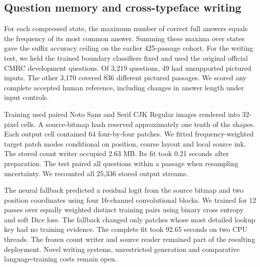 \subsection*{Question memory and cross-typeface writing}
For each compressed state, the maximum number of correct full answers equals
the frequency of its most common answer. Summing these maxima over states
gave the suffix accuracy ceiling on the earlier 425-passage cohort.
For the writing test, we held the trained boundary classifiers fixed and
used the original official CMRC development questions. Of 3,219 questions,
49 had unsupported pictured inputs. The other 3,170 covered 836 different
pictured passages. We scored any complete accepted human reference, including
changes in answer length under input controls.

Training used paired Noto Sans and Serif CJK Regular images rendered into
32-pixel cells. A source-bitmap hash reserved approximately one tenth of
the shapes. Each output cell contained 64 four-by-four patches. We fitted
frequency-weighted target patch modes conditional on position, coarse layout
and local source ink. The stored count writer occupied 2.63 MB. Its fit took
0.21 seconds after preparation. The test paired all questions within a passage
when resampling uncertainty. We recounted all 25,336 stored output streams.

The neural fallback predicted a residual logit from the source bitmap and
two position coordinates using four 16-channel convolutional blocks. We
trained for 12 passes over equally weighted distinct training pairs using
binary cross entropy and soft Dice loss. The fallback changed only patches
whose most detailed lookup key had no training evidence. The complete fit
took 92.65 seconds on two CPU threads. The frozen count writer and source
reader remained part of the resulting deployment. Novel writing systems,
unrestricted generation and comparative language-training costs remain open.
